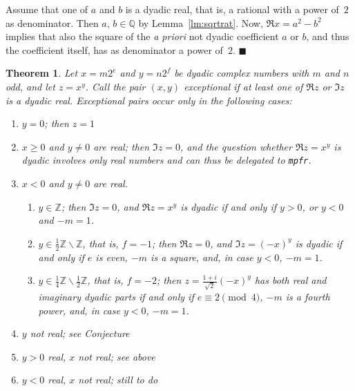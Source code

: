 \documentclass {article}
\newcommand {\mpfr}{{\tt mpfr}}
\newcommand {\Z}{\mathbb Z}
\newcommand {\Q}{\mathbb Q}
\renewcommand {\geq}{\geqslant}
\newtheorem{theorem}{Theorem}
\newenvironment{proof}{\noindent{\bf Proof:}}{{\hspace* {\fill}$\blacksquare$}}
\begin{document}
\begin{proof}
Assume that one of $a$ and $b$ is a dyadic real, that is, a rational with
a power of~$2$ as denominator. Then $a$, $b \in \Q$ by Lemma~\ref {lm:sqrtrat}.
Now, $\Re x = a^2 - b^2$ implies that also the square of the \textit {a priori}
not dyadic coefficient $a$ or $b$, and thus the coefficient itself,
has as denominator a power of~$2$.
\end{proof}


\begin {theorem}
Let $x = m 2^e$ and $y = n 2^f$ be dyadic complex numbers with $m$ and $n$ odd,
and let $z = x^y$. Call the pair $(x, y)$ {\em exceptional} if at least
one of $\Re z$ or $\Im z$ is a dyadic real. Exceptional pairs occur
only in the following cases:
\begin {enumerate}
\item
$y = 0$; then $z = 1$
\item
$x \geq 0$ and $y \neq 0$ are real; then $\Im z = 0$, and the question
whether $\Re z = x^y$ is dyadic involves only real numbers and
can thus be delegated to \mpfr.
\item
$x < 0$ and $y \neq 0$ are real.
\begin {enumerate}
\item
$y \in \Z$; then $\Im z = 0$, and $\Re z = x^y$ is dyadic if and only if
$y > 0$, or $y < 0$ and $-m = 1$.
\item
$y \in \frac {1}{2} \Z \backslash \Z$, that is, $f = -1$;
then $\Re z = 0$, and $\Im z = (-x)^y$ is dyadic if and only if
$e$ is even, $-m$ is a square, and, in case $y < 0$, $-m = 1$.
\item
$y \in \frac {1}{4} \Z \backslash \frac {1}{2} \Z$, that is, $f = -2$;
then $z = \frac {1 + i}{\sqrt 2} (-x)^y$ has both real and imaginary
dyadic parts if and only if
$e \equiv 2 \pmod 4$, $-m$ is a fourth power, and, in case $y < 0$, $-m = 1$.
\end {enumerate}
\item
$y$ not real;
see Conjecture
\item
$y > 0$ real, $x$ not real;
see above
\item
$y < 0$ real, $x$ not real;
still to do
\end {enumerate}
\end {theorem}
\end{document}

